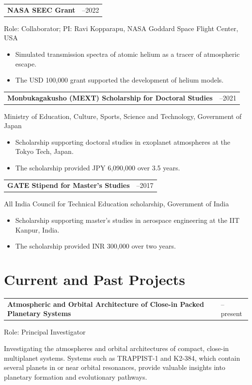 \documentclass[10pt,a4paper]{article}
\makeatletter
\newcommand{\grantheading}[2]{%
\begin{tabularx}{\textwidth}{
    @{}
    >{\raggedright\arraybackslash}X
    >{\raggedleft\arraybackslash}p{4.5cm}
    @{}
}
\textbf{#1} & #2
\end{tabularx}
}
\newenvironment{lightitems}
{%
  \begin{itemize}[
      label=\textcolor{entrylight}{\textbullet},
      leftmargin=1.3em,
      itemsep=1pt,
      topsep=2pt,
      parsep=0pt
  ]
  \color{entrylight}
}
{%
  \end{itemize}
}
\newcommand{\projectentry}[4]{%
\begin{tabularx}{\textwidth}{
    @{}
    >{\raggedright\arraybackslash}X
    >{\raggedleft\arraybackslash}p{2.5cm}
    @{}
}
\textbf{#1} & #2
\end{tabularx}

#3

{\color{entrylight}#4\par}

\vspace{4pt}
}
\makeatother
\begin{document}
\grantheading
{NASA SEEC Grant}
{2020--2022}
Role: Collaborator; PI: Ravi Kopparapu, NASA Goddard Space Flight Center, USA \vspace{-1.5mm}
\begin{lightitems}
\item
Simulated transmission spectra of atomic helium as a tracer of
atmospheric escape.
\item
The USD 100,000 grant supported the development of helium models.
\end{lightitems}


\grantheading
{Monbukagakusho (MEXT) Scholarship for Doctoral Studies}
{2018--2021}
Ministry of Education, Culture, Sports, Science and Technology,
Government of Japan \vspace{-1.5mm}
\begin{lightitems}
\item
Scholarship supporting doctoral studies in exoplanet atmospheres at
the Tokyo Tech, Japan.
\item
The scholarship provided JPY 6,090,000 over 3.5 years.
\end{lightitems}


\grantheading
{GATE Stipend for Master's Studies}
{2015--2017}
All India Council for Technical Education scholarship,
Government of India \vspace{-1.5mm}
\begin{lightitems}
\item
Scholarship supporting master's studies in aerospace engineering at
the IIT Kanpur, India.
\item
The scholarship provided INR 300,000 over two years.

\end{lightitems}



\section{Current and Past Projects}

\projectentry
{Atmospheric and Orbital Architecture of Close-in Packed Planetary Systems}
{2023--present}
{\vspace{-1mm}Role: Principal Investigator}
{\vspace{-1.5mm}Investigating the atmospheres and orbital architectures of compact,
close-in multiplanet systems. Systems such as TRAPPIST-1 and K2-384,
which contain several planets in or near orbital resonances, provide
valuable insights into planetary formation and evolutionary pathways.}
\end{document}
